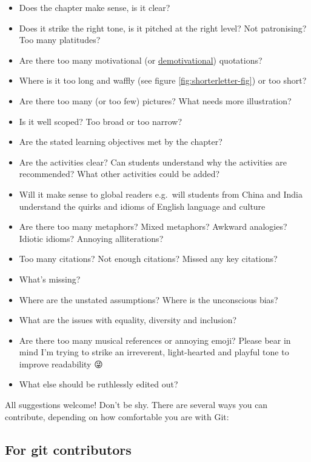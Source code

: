 \documentclass[
]{book}
\providecommand{\tightlist}{%
  \setlength{\itemsep}{0pt}\setlength{\parskip}{0pt}}
\begin{document}
\begin{itemize}
\tightlist
\item
  Does the chapter make sense, is it clear?
\item
  Does it strike the right tone, is it pitched at the right level? Not patronising? Too many platitudes?
\item
  Are there too many motivational (or \href{https://despair.com/collections/demotivators}{demotivational}) quotations?
\item
  Where is it too long and waffly (see figure \ref{fig:shorterletter-fig}) or too short?
\item
  Are there too many (or too few) pictures? What needs more illustration?
\item
  Is it well scoped? Too broad or too narrow?
\item
  Are the stated learning objectives met by the chapter?
\item
  Are the activities clear? Can students understand why the activities are recommended? What other activities could be added?
\item
  Will it make sense to global readers e.g.~will students from China and India understand the quirks and idioms of English language and culture
\item
  Are there too many metaphors? Mixed metaphors? Awkward analogies? Idiotic idioms? Annoying alliterations?
\item
  Too many citations? Not enough citations? Missed any key citations?
\item
  What's missing?
\item
  Where are the unstated assumptions? Where is the unconscious bias?
\item
  What are the issues with equality, diversity and inclusion?
\item
  Are there too many musical references or annoying emoji? Please bear in mind I'm trying to strike an irreverent, light-hearted and playful tone to improve readability 😜
\item
  What else should be ruthlessly edited out?
\end{itemize}

All suggestions welcome! Don't be shy. There are several ways you can contribute, depending on how comfortable you are with Git:

\hypertarget{techies}{%
\subsection{For git contributors}\label{techies}}
\end{document}
